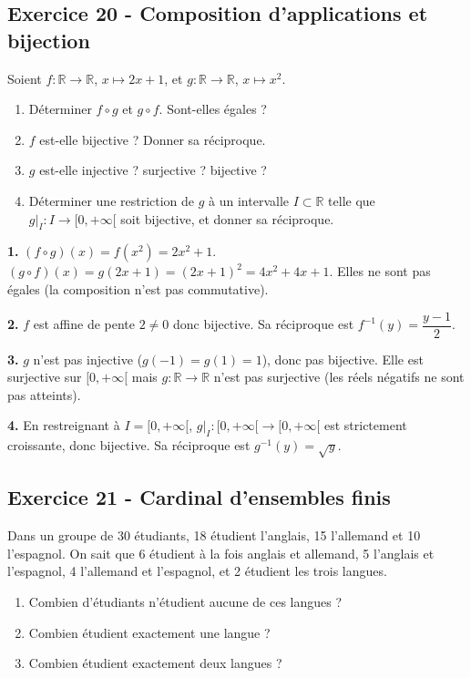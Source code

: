 \documentclass[12pt,a4paper]{article}
\begin{document}
\subsection*{Exercice 20 - Composition d'applications et bijection \niveau{\moyen}}

\begin{boiteexercice}
Soient $f : \mathbb{R}\to\mathbb{R}$, $x\mapsto 2x+1$, et $g : \mathbb{R}\to\mathbb{R}$, $x\mapsto x^2$.
\begin{enumerate}
  \item Déterminer $f\circ g$ et $g\circ f$. Sont-elles égales ?
  \item $f$ est-elle bijective ? Donner sa réciproque.
  \item $g$ est-elle injective ? surjective ? bijective ?
  \item Déterminer une restriction de $g$ à un intervalle $I\subset\mathbb{R}$ telle que $g|_I : I\to[0,+\infty[$ soit bijective, et donner sa réciproque.
\end{enumerate}
\end{boiteexercice}

\begin{boitecorrige}
\textbf{1.} $(f\circ g)(x) = f(x^2) = 2x^2+1$. $(g\circ f)(x) = g(2x+1) = (2x+1)^2 = 4x^2+4x+1$. Elles ne sont pas égales (la composition n'est pas commutative).

\textbf{2.} $f$ est affine de pente $2\neq0$ donc bijective. Sa réciproque est $f^{-1}(y) = \dfrac{y-1}{2}$.

\textbf{3.} $g$ n'est pas injective ($g(-1)=g(1)=1$), donc pas bijective. Elle est surjective sur $[0,+\infty[$ mais $g:\mathbb{R}\to\mathbb{R}$ n'est pas surjective (les réels négatifs ne sont pas atteints).

\textbf{4.} En restreignant à $I = [0,+\infty[$, $g|_I : [0,+\infty[\to[0,+\infty[$ est strictement croissante, donc bijective. Sa réciproque est $g^{-1}(y) = \sqrt{y}$.
\reponse{$g|_{[0,+\infty[}^{-1}(y) = \sqrt{y}$}
\end{boitecorrige}

\subsection*{Exercice 21 - Cardinal d'ensembles finis \niveau{\moyen}}

\begin{boiteexercice}
Dans un groupe de 30 étudiants, 18 étudient l'anglais, 15 l'allemand et 10 l'espagnol. On sait que 6 étudient à la fois anglais et allemand, 5 l'anglais et l'espagnol, 4 l'allemand et l'espagnol, et 2 étudient les trois langues.
\begin{enumerate}
  \item Combien d'étudiants n'étudient aucune de ces langues ?
  \item Combien étudient exactement une langue ?
  \item Combien étudient exactement deux langues ?
\end{enumerate}
\end{boiteexercice}
\end{document}

